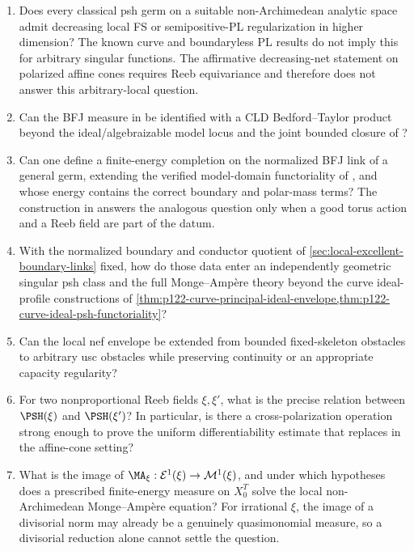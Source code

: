 \begin{enumerate}
\item Does every classical psh germ on a suitable non-Archimedean analytic
      space admit decreasing local FS or semipositive-PL regularization in
      higher dimension?  The known curve and boundaryless PL results do not
      imply this for arbitrary singular functions.  The affirmative
      decreasing-net statement on polarized affine cones requires Reeb
      equivariance and therefore does not answer this arbitrary-local
      question.
\item Can the BFJ measure in  be identified with a
      CLD Bedford--Taylor product beyond the ideal/algebraizable model locus
      and the joint bounded closure of
      ?
\item Can one define a finite-energy completion on the normalized BFJ link of
      a general germ, extending the verified model-domain functoriality of
      , and whose energy contains the correct
      boundary and polar-mass terms?  The construction in
       answers the analogous question
      only when a good torus action and a Reeb field are part of the datum.
\item With the normalized boundary and conductor quotient of
      \cref{sec:local-excellent-boundary-links} fixed, how do those data
      enter an independently geometric singular psh class and the full
      Monge--Amp\`ere theory beyond the curve ideal-profile constructions of
      \cref{thm:p122-curve-principal-ideal-envelope,thm:p122-curve-ideal-psh-functoriality}?
\item Can the local nef envelope be extended from bounded fixed-skeleton
      obstacles to arbitrary usc obstacles while preserving continuity or an
      appropriate capacity regularity?
\item For two nonproportional Reeb fields $\xi,\xi'$, what is the precise
      relation between $\PSH(\xi)$ and $\PSH(\xi')$?  In particular, is
      there a cross-polarization operation strong enough to prove the uniform
      differentiability estimate that replaces
      \cite[Theorem~8.5]{BJ22} in the affine-cone setting?
\item What is the image of
      $\MA_\xi:\mathcal E^1(\xi)\to\mathcal M^1(\xi)$, and under which
      hypotheses does a prescribed finite-energy measure on $X_0^T$ solve the local
      non-Archimedean Monge--Amp\`ere equation?  For irrational $\xi$, the
      image of a divisorial norm may already be a genuinely quasimonomial
      measure, so a divisorial reduction alone cannot settle the question.
\end{enumerate}

